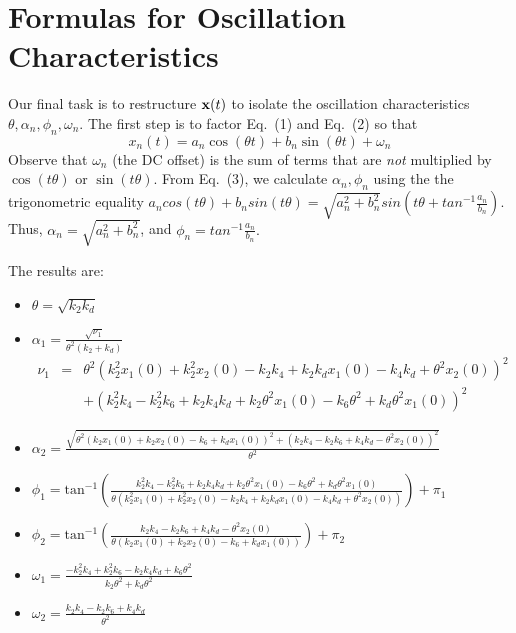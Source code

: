 \documentclass{bmcart}
\begin{document}
\section{Formulas for Oscillation Characteristics}
Our final task is to restructure ${\bf x} (t)$ to isolate the
oscillation characteristics $\theta, \alpha_n, \phi_n, \omega_n$.
The first step is to factor
Eq.~(1) and Eq.~(2) so that 
\begin{equation}
x_n (t) = a_n \cos(\theta t) + b_n \sin(\theta t) + \omega_n
\label{eq:factor}
\end{equation}
Observe that $\omega_n$ (the DC offset) is the sum of terms that are {\em not} multiplied by $\cos(t \theta)$
or $\sin(t \theta)$.
From Eq.~(3), we calculate $\alpha_n, \phi_n$ using the
the trigonometric equality
$a_n cos(t \theta) + b_n sin(t \theta) 
= \sqrt{a_n^2 + b_n^2} sin(t \theta + tan^{-1}\frac{a_n}{b_n}).$
Thus, $\alpha_n = \sqrt{a_n^2 + b_n^2}$, and
$\phi_n = tan^{-1}\frac{a_n}{b_n}.$

    The results are:

\begin{itemize}
\item
  $\theta = \sqrt{k_2 k_d}$

\item
$\alpha_1  = 
\frac{\sqrt{\nu_1}}{\theta^{2} \left(k_{2} + k_{d}\right)}$
\begin{eqnarray*}
\nu_1 & =  &
\theta^{2} \left(k_{2}^{2} x_1 (0) + k_{2}^{2} x_2 (0) - k_{2} k_{4} + k_{2} k_{d} x_1 (0) - k_{4} k_{d} + \theta^{2} x_2 (0)\right)^{2}  \\
& & +
\left(k_{2}^{2} k_{4} - k_{2}^{2} k_{6} + k_{2} k_{4} k_{d} + k_{2} \theta^{2} x_1 (0) - k_{6} \theta^{2} + k_{d} \theta^{2} x_1 (0)\right)^{2}
\end{eqnarray*}

\item
  $\alpha_2 =
  \frac{\sqrt{\theta^{2} \left(k_{2} x_1 (0) + k_{2} x_2 (0) - k_{6} + k_{d} x_1 (0)\right)^{2} + \left(k_{2} k_{4} - k_{2} k_{6} + k_{4} k_{d} - \theta^{2} x_2 (0)\right)^{2}}}{\theta^{2}}$

\item
  $\phi_1 =
  \operatorname{tan^{-1}}{\left(\frac{k_{2}^{2} k_{4} - k_{2}^{2} k_{6} + k_{2} k_{4} k_{d} + k_{2} \theta^{2} x_1 (0) - k_{6} \theta^{2} + k_{d} \theta^{2} x_1 (0)}{\theta \left(k_{2}^{2} x_1 (0) + k_{2}^{2} x_2 (0) - k_{2} k_{4} + k_{2} k_{d} x_1 (0) - k_{4} k_{d} + \theta^{2} x_2 (0)\right)} \right)} + \pi_1$

\item
  $\phi_2 = 
  \operatorname{tan^{-1}}{\left(\frac{k_{2} k_{4} - k_{2} k_{6} + k_{4} k_{d} - \theta^{2} x_2 (0)}{\theta \left(k_{2} x_1 (0) + k_{2} x_2 (0) - k_{6} + k_{d} x_1 (0)\right)} \right)} + \pi_2$

\item
  $\omega_1 = \frac{- k_{2}^{2} k_{4} + k_{2}^{2} k_{6} - k_{2} k_{4} k_{d} + k_{6} \theta^{2}}{k_{2} \theta^{2} + k_{d} \theta^{2}}$
\item
  $\omega_2 = \frac{k_{2} k_{4} - k_{2} k_{6} + k_{4} k_{d}}{\theta^{2}}$
\end{itemize}
\end{document}
